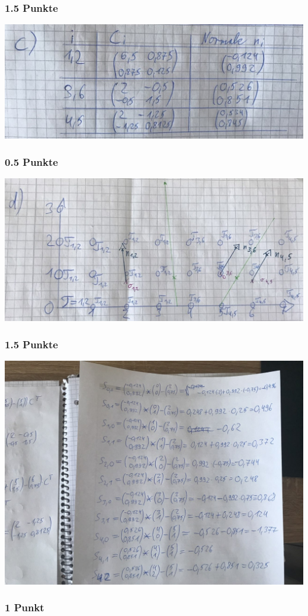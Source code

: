 \subsubsection{1.5 Punkte}
\includegraphics[scale=0.5]{3d.jpg}
\subsubsection{0.5 Punkte}
\includegraphics[scale=0.5]{3a.jpg}
\subsubsection{1.5 Punkte}
\includegraphics[scale=0.3]{3dR.jpg}
\subsubsection{1 Punkt}
